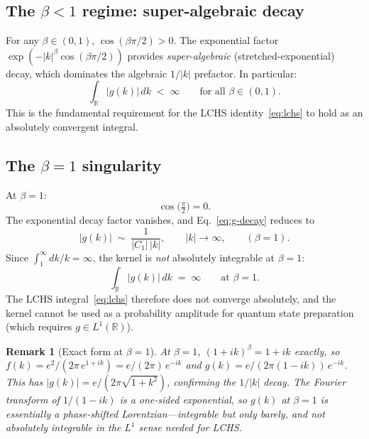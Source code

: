\documentclass[11pt]{article}
\newtheorem{remark}{Remark}
\begin{document}
\subsection{The $\beta < 1$ regime: super-algebraic decay}

For any $\beta \in (0,1)$, $\cos(\beta\pi/2) > 0$.  The exponential
factor $\exp(-|k|^\beta\cos(\beta\pi/2))$ provides
\emph{super-algebraic} (stretched-exponential) decay, which dominates
the algebraic $1/|k|$ prefactor.  In particular:
\begin{equation}\label{eq:g-integrable}
  \int_{\mathbb{R}} |g(k)|\,dk \;<\; \infty
  \qquad \text{for all } \beta \in (0,1).
\end{equation}
This is the fundamental requirement for the LCHS identity~\eqref{eq:lchs}
to hold as an absolutely convergent integral.

\subsection{The $\beta = 1$ singularity}

At $\beta = 1$:
\begin{equation}\label{eq:cos-zero}
  \cos\!\bigl(\tfrac{\pi}{2}\bigr) = 0.
\end{equation}
The exponential decay factor vanishes, and Eq.~\eqref{eq:g-decay} reduces to
\begin{equation}\label{eq:g-beta1}
  |g(k)| \;\sim\; \frac{1}{|C_1|\,|k|}, \qquad |k| \to \infty,
  \qquad (\beta = 1).
\end{equation}
Since $\int_1^\infty dk/k = \infty$, the kernel is \emph{not} absolutely
integrable at $\beta = 1$:
\begin{equation}\label{eq:diverge}
  \int_{\mathbb{R}} |g(k)|\,dk \;=\; \infty
  \qquad \text{at } \beta = 1.
\end{equation}
The LCHS integral~\eqref{eq:lchs} therefore does not converge absolutely,
and the kernel cannot be used as a probability amplitude for quantum
state preparation (which requires $g \in L^1(\mathbb{R})$).

\begin{remark}[Exact form at $\beta = 1$]
At $\beta = 1$, $(1+ik)^\beta = 1 + ik$ exactly, so
$f(k) = e^{2}/(2\pi\,e^{1+ik}) = e/(2\pi)\,e^{-ik}$ and
$g(k) = e/(2\pi(1-ik))\,e^{-ik}$.
This has $|g(k)| = e/(2\pi\sqrt{1+k^2})$, confirming the $1/|k|$ decay.
The Fourier transform of $1/(1-ik)$ is a one-sided exponential, so $g(k)$
at $\beta = 1$ is essentially a phase-shifted Lorentzian---integrable
but only barely, and not absolutely integrable in the $L^1$ sense needed
for LCHS.
\end{remark}
\end{document}
